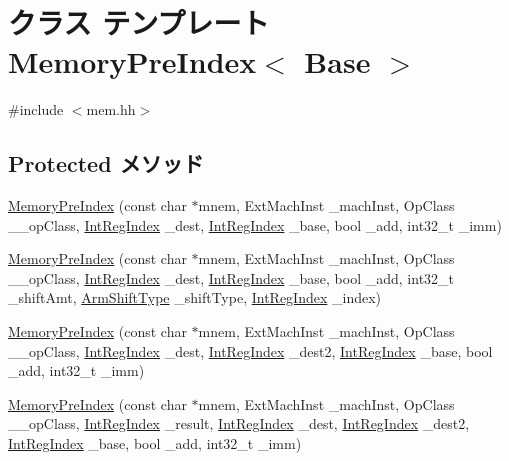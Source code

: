 \hypertarget{classArmISA_1_1MemoryPreIndex}{
\section{クラス テンプレート MemoryPreIndex$<$ Base $>$}
\label{classArmISA_1_1MemoryPreIndex}
}


{\ttfamily \#include $<$mem.hh$>$}\subsection*{Protected メソッド}
\begin{DoxyCompactItemize}
\item 
\hyperlink{classArmISA_1_1MemoryPreIndex_a58ad09833612aa6c13a629c4dec47f7a}{MemoryPreIndex} (const char $\ast$mnem, ExtMachInst \_\-machInst, OpClass \_\-\_\-opClass, \hyperlink{namespaceArmISA_ae64680ba9fb526106829d6bf92fc791b}{IntRegIndex} \_\-dest, \hyperlink{namespaceArmISA_ae64680ba9fb526106829d6bf92fc791b}{IntRegIndex} \_\-base, bool \_\-add, int32\_\-t \_\-imm)
\item 
\hyperlink{classArmISA_1_1MemoryPreIndex_a914aef1c0664bb4080cb22584dc9c7ad}{MemoryPreIndex} (const char $\ast$mnem, ExtMachInst \_\-machInst, OpClass \_\-\_\-opClass, \hyperlink{namespaceArmISA_ae64680ba9fb526106829d6bf92fc791b}{IntRegIndex} \_\-dest, \hyperlink{namespaceArmISA_ae64680ba9fb526106829d6bf92fc791b}{IntRegIndex} \_\-base, bool \_\-add, int32\_\-t \_\-shiftAmt, \hyperlink{namespaceArmISA_a209d79feaaef0aa2f54ae62e53ee90de}{ArmShiftType} \_\-shiftType, \hyperlink{namespaceArmISA_ae64680ba9fb526106829d6bf92fc791b}{IntRegIndex} \_\-index)
\item 
\hyperlink{classArmISA_1_1MemoryPreIndex_a433de8e6276d28df8ee2acc7b6955542}{MemoryPreIndex} (const char $\ast$mnem, ExtMachInst \_\-machInst, OpClass \_\-\_\-opClass, \hyperlink{namespaceArmISA_ae64680ba9fb526106829d6bf92fc791b}{IntRegIndex} \_\-dest, \hyperlink{namespaceArmISA_ae64680ba9fb526106829d6bf92fc791b}{IntRegIndex} \_\-dest2, \hyperlink{namespaceArmISA_ae64680ba9fb526106829d6bf92fc791b}{IntRegIndex} \_\-base, bool \_\-add, int32\_\-t \_\-imm)
\item 
\hyperlink{classArmISA_1_1MemoryPreIndex_a3da1a9581c562c1bc28eb7fdac4dbc0f}{MemoryPreIndex} (const char $\ast$mnem, ExtMachInst \_\-machInst, OpClass \_\-\_\-opClass, \hyperlink{namespaceArmISA_ae64680ba9fb526106829d6bf92fc791b}{IntRegIndex} \_\-result, \hyperlink{namespaceArmISA_ae64680ba9fb526106829d6bf92fc791b}{IntRegIndex} \_\-dest, \hyperlink{namespaceArmISA_ae64680ba9fb526106829d6bf92fc791b}{IntRegIndex} \_\-dest2, \hyperlink{namespaceArmISA_ae64680ba9fb526106829d6bf92fc791b}{IntRegIndex} \_\-base, bool \_\-add, int32\_\-t \_\-imm)

\end{DoxyCompactItemize}

